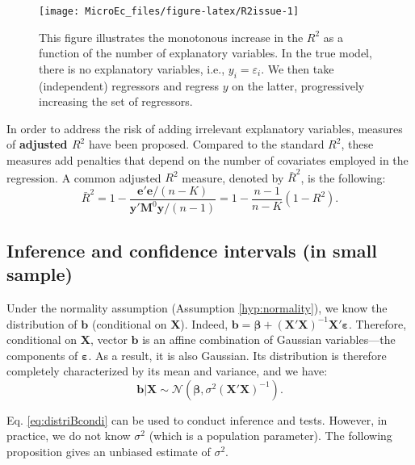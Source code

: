 \documentclass[
  12pt,
]{book}
\theoremstyle{definition}
\theoremstyle{definition}
\theoremstyle{definition}
\theoremstyle{definition}
\theoremstyle{remark}
\begin{document}
\begin{figure}
\texttt{[image: MicroEc\_files/figure-latex/R2issue-1]} \caption{This figure illustrates the monotonous increase in the $R^2$ as a function of the number of explanatory variables. In the true model, there is no explanatory variables, i.e., $y_i = \varepsilon_i$. We then take (independent) regressors and regress $y$ on the latter, progressively increasing the set of regressors.}\label{fig:R2issue}
\end{figure}

In order to address the risk of adding irrelevant explanatory variables, measures of \textbf{adjusted \(R^2\)} have been proposed. Compared to the standard \(R^2\), these measures add penalties that depend on the number of covariates employed in the regression. A common adjusted \(R^2\) measure, denoted by \(\bar{R}^2\), is the following:
\begin{equation*}
\boxed{\bar{R}^2 = 1 - \frac{\mathbf{e}'\mathbf{e}/(n-K)}{\mathbf{y}'\mathbf{M}^0\mathbf{y}/(n-1)} = 1 - \frac{n-1}{n-K}(1-R^2).}
\end{equation*}

\hypertarget{inference-and-confidence-intervals-in-small-sample}{%
\subsection{Inference and confidence intervals (in small sample)}\label{inference-and-confidence-intervals-in-small-sample}}

Under the normality assumption (Assumption \ref{hyp:normality}), we know the distribution of \(\mathbf{b}\) (conditional on \(\mathbf{X}\)). Indeed, \(\mathbf{b} = \boldsymbol\beta + (\mathbf{X}'\mathbf{X})^{-1} \mathbf{X}'\boldsymbol\varepsilon\). Therefore, conditional on \(\mathbf{X}\), vector \(\mathbf{b}\) is an affine combination of Gaussian variables---the components of \(\boldsymbol\varepsilon\). As a result, it is also Gaussian. Its distribution is therefore completely characterized by its mean and variance, and we have:
\begin{equation}
\mathbf{b}|\mathbf{X} \sim \mathcal{N}(\boldsymbol\beta,\sigma^2(\mathbf{X}'\mathbf{X})^{-1}).\label{eq:distriBcondi}
\end{equation}

Eq. \eqref{eq:distriBcondi} can be used to conduct inference and tests. However, in practice, we do not know \(\sigma^2\) (which is a population parameter). The following proposition gives an unbiased estimate of \(\sigma^2\).
\end{document}
